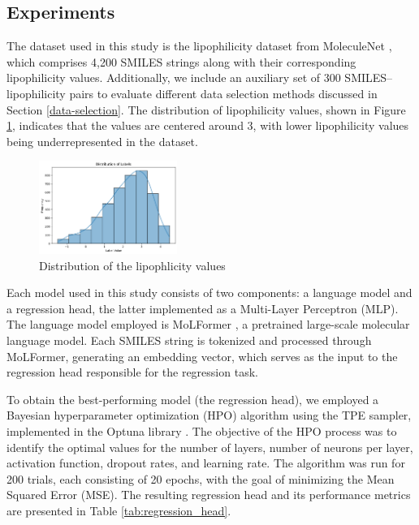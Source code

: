 \documentclass[11pt]{article}
\begin{document}
\subsection{Experiments}
\label{experiments}
The dataset used in this study is the lipophilicity dataset from MoleculeNet \cite{wu2018moleculenet}, which comprises 4,200 SMILES strings along with their corresponding lipophilicity values. Additionally, we include an auxiliary set of 300 SMILES–lipophilicity pairs to evaluate different data selection methods discussed in Section \ref{data-selection}. The distribution of lipophilicity values, shown in Figure \ref{fig:data-distrib}, indicates that the values are centered around 3, with lower lipophilicity values being underrepresented in the dataset.

\begin{figure}[htbp]
    \centering
    \includegraphics[width=0.4\textwidth]{data-distrib.png} %
    \caption{Distribution of the lipophlicity values} %
    \label{fig:data-distrib} %
\end{figure}

Each model used in this study consists of two components: a language model and a regression head, the latter implemented as a Multi-Layer Perceptron (MLP). The language model employed is MoLFormer \cite{ross2022large}, a pretrained large-scale molecular language model. Each SMILES string is tokenized and processed through MoLFormer, generating an embedding vector, which serves as the input to the regression head responsible for the regression task.

To obtain the best-performing model (the regression head), we employed a Bayesian hyperparameter optimization (HPO) algorithm using the TPE sampler, implemented in the Optuna library \cite{10.1145/3292500.3330701}. The objective of the HPO process was to identify the optimal values for the number of layers, number of neurons per layer, activation function, dropout rates, and learning rate. The algorithm was run for 200 trials, each consisting of 20 epochs, with the goal of minimizing the Mean Squared Error (MSE). The resulting regression head and its performance metrics are presented in Table \ref{tab:regression_head}.
\end{document}
